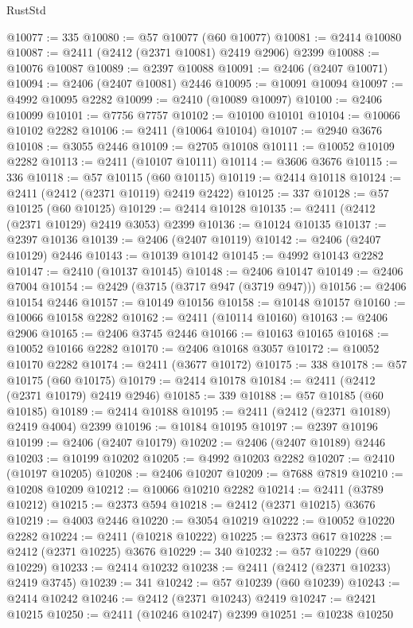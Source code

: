 \begin{lexlean}{RustStd}
\begin{coremodule}
@10077 := 335
@10080 := @57 @10077 (@60 @10077)
@10081 := @2414 @10080
@10087 := @2411 (@2412 (@2371 @10081) @2419 @2906) @2399
@10088 := @10076 @10087
@10089 := @2397 @10088
@10091 := @2406 (@2407 @10071)
@10094 := @2406 (@2407 @10081) @2446
@10095 := @10091 @10094
@10097 := @4992 @10095 @2282
@10099 := @2410 (@10089 @10097)
@10100 := @2406 @10099
@10101 := @7756 @7757
@10102 := @10100 @10101
@10104 := @10066 @10102 @2282
@10106 := @2411 (@10064 @10104)
@10107 := @2940 @3676
@10108 := @3055 @2446
@10109 := @2705 @10108
@10111 := @10052 @10109 @2282
@10113 := @2411 (@10107 @10111)
@10114 := @3606 @3676
@10115 := 336
@10118 := @57 @10115 (@60 @10115)
@10119 := @2414 @10118
@10124 := @2411 (@2412 (@2371 @10119) @2419 @2422)
@10125 := 337
@10128 := @57 @10125 (@60 @10125)
@10129 := @2414 @10128
@10135 := @2411 (@2412 (@2371 @10129) @2419 @3053) @2399
@10136 := @10124 @10135
@10137 := @2397 @10136
@10139 := @2406 (@2407 @10119)
@10142 := @2406 (@2407 @10129) @2446
@10143 := @10139 @10142
@10145 := @4992 @10143 @2282
@10147 := @2410 (@10137 @10145)
@10148 := @2406 @10147
@10149 := @2406 @7004
@10154 := @2429 (@3715 (@3717 @947 (@3719 @947)))
@10156 := @2406 @10154 @2446
@10157 := @10149 @10156
@10158 := @10148 @10157
@10160 := @10066 @10158 @2282
@10162 := @2411 (@10114 @10160)
@10163 := @2406 @2906
@10165 := @2406 @3745 @2446
@10166 := @10163 @10165
@10168 := @10052 @10166 @2282
@10170 := @2406 @10168 @3057
@10172 := @10052 @10170 @2282
@10174 := @2411 (@3677 @10172)
@10175 := 338
@10178 := @57 @10175 (@60 @10175)
@10179 := @2414 @10178
@10184 := @2411 (@2412 (@2371 @10179) @2419 @2946)
@10185 := 339
@10188 := @57 @10185 (@60 @10185)
@10189 := @2414 @10188
@10195 := @2411 (@2412 (@2371 @10189) @2419 @4004) @2399
@10196 := @10184 @10195
@10197 := @2397 @10196
@10199 := @2406 (@2407 @10179)
@10202 := @2406 (@2407 @10189) @2446
@10203 := @10199 @10202
@10205 := @4992 @10203 @2282
@10207 := @2410 (@10197 @10205)
@10208 := @2406 @10207
@10209 := @7688 @7819
@10210 := @10208 @10209
@10212 := @10066 @10210 @2282
@10214 := @2411 (@3789 @10212)
@10215 := @2373 @594
@10218 := @2412 (@2371 @10215) @3676
@10219 := @4003 @2446
@10220 := @3054 @10219
@10222 := @10052 @10220 @2282
@10224 := @2411 (@10218 @10222)
@10225 := @2373 @617
@10228 := @2412 (@2371 @10225) @3676
@10229 := 340
@10232 := @57 @10229 (@60 @10229)
@10233 := @2414 @10232
@10238 := @2411 (@2412 (@2371 @10233) @2419 @3745)
@10239 := 341
@10242 := @57 @10239 (@60 @10239)
@10243 := @2414 @10242
@10246 := @2412 (@2371 @10243) @2419
@10247 := @2421 @10215
@10250 := @2411 (@10246 @10247) @2399
@10251 := @10238 @10250

\end{coremodule}
\end{lexlean}

